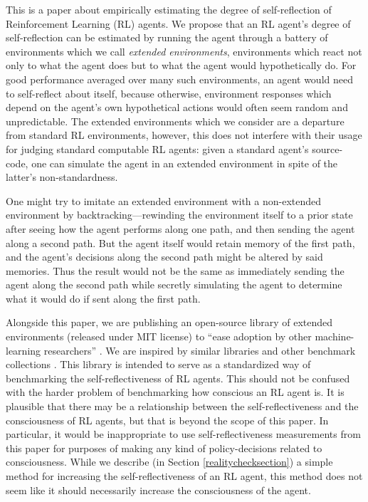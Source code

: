 \documentclass{article}
\begin{document}
This is a paper about empirically estimating the degree of self-reflection of
Reinforcement Learning (RL) agents. We propose that an RL agent's degree of self-reflection
can be estimated by running the agent through a battery of environments which we call
\emph{extended environments}, environments which react not only to what the agent does
but to what the agent would hypothetically do.
For good performance averaged over
many such environments, an agent would need to self-reflect about itself, because
otherwise, environment responses which depend on the agent's own hypothetical actions
would often seem random and unpredictable. The extended environments which we
consider are a departure from standard RL environments, however, this does not interfere
with their usage for judging standard computable RL agents: given a standard agent's
source-code, one can simulate the agent in an extended environment in spite of the
latter's non-standardness.

One might try to imitate an extended environment with a non-extended environment by
backtracking---rewinding the environment itself to a prior state after seeing how the
agent performs along one path, and then sending the agent along a second path.
But the agent itself would retain memory of the first path, and the agent's decisions
along the second path might be altered by said memories. Thus the result would not be
the same as immediately sending the agent along the second path while secretly simulating
the agent to determine what it would do if sent along the first path.

Alongside this paper, we are publishing an open-source library \cite{library} of extended
environments (released under MIT license)
to ``ease adoption by other machine-learning researchers''
\cite{sonnenburg2007need}.
We are
inspired by similar libraries and other benchmark collections
\cite{bellemare2013arcade}
\cite{beyret2019animal} \cite{brockman2016openai} \cite{chollet2019measure}
\cite{cobbe2020leveraging}
\cite{hendrycks2019benchmarking}
\cite{yampolskiy2017detecting}.
This library is intended to serve as a standardized way of
benchmarking the self-reflectiveness of RL agents. This should not be confused
with the harder problem of benchmarking how conscious an RL agent is. It is
plausible that there may be a relationship between the self-reflectiveness and
the consciousness of RL agents, but that is beyond the scope of this paper.
In particular, it would be inappropriate to use self-reflectiveness
measurements from this paper for purposes of making any kind
of policy-decisions related to consciousness.
While we describe (in Section \ref{realitychecksection})
a simple method for increasing the self-reflectiveness of an RL agent,
this method does not seem like it should necessarily increase the consciousness of
the agent.
\end{document}
